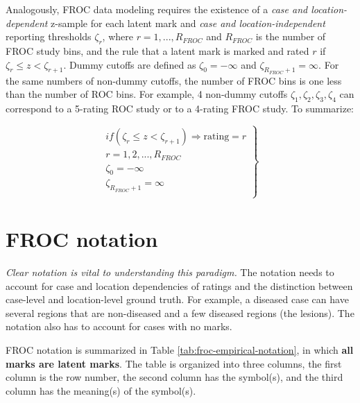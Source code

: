\documentclass[
]{book}
\begin{document}
Analogously, FROC data modeling requires the existence of a \emph{case and location-dependent} z-sample for each latent mark and \emph{case and location-independent} reporting thresholds \(\zeta_r\), where \(r = 1, ..., R_{FROC}\) and \(R_{FROC}\) is the number of FROC study bins, and the rule that a latent mark is marked and rated \(r\) if \(\zeta_r \leq z < \zeta_{r+1}\). Dummy cutoffs are defined as \(\zeta_0 = -\infty\) and \(\zeta_{R_{FROC}+1} = \infty\). For the same numbers of non-dummy cutoffs, the number of FROC bins is one less than the number of ROC bins. For example, 4 non-dummy cutoffs \(\zeta_1, \zeta_2, \zeta_3, \zeta_4\) can correspond to a 5-rating ROC study or to a 4-rating FROC study. To summarize:

\begin{equation}
\left.
\begin{aligned}  
if \left (\zeta_r \le z < \zeta_{r+1}  \right )\Rightarrow \text {rating} = r\\
r = 1, 2, ..., R_{FROC}\\
\zeta_0 = -\infty\\
\zeta_{R_{FROC}+1} = \infty\\
\end{aligned}
\right \}
\label{eq:froc-empirical-binning-rule-froc}
\end{equation}

\hypertarget{froc-empirical-notation}{%
\section{FROC notation}\label{froc-empirical-notation}}

\emph{Clear notation is vital to understanding this paradigm.} The notation needs to account for case and location dependencies of ratings and the distinction between case-level and location-level ground truth. For example, a diseased case can have several regions that are non-diseased and a few diseased regions (the lesions). The notation also has to account for cases with no marks.

FROC notation is summarized in Table \ref{tab:froc-empirical-notation}, in which \textbf{all marks are latent marks}. The table is organized into three columns, the first column is the row number, the second column has the symbol(s), and the third column has the meaning(s) of the symbol(s).
\end{document}

